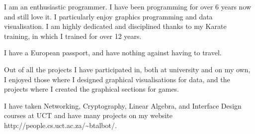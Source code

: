 \documentclass[11pt,a4paper,sans]{moderncv}        %
\begin{document}
I am an enthusiastic programmer. I have been programming for over 6 years now and still love it. I particularly enjoy graphics programming and data visualisation. I am highly dedicated and disciplined thanks to my Karate training, in which I trained for over 12 years.

I have a European passport, and have nothing against having to travel.

Out of all the projects I have participated in, both at university and on my own, I enjoyed those where I designed graphical visualisations for data, and the projects where I created the graphical sections for games. 

I have taken Networking, Cryptography, Linear Algebra, and Interface Design courses at UCT and have many projects on my website http://people.cs.uct.ac.za/\textasciitilde btalbot/.


\makeletterclosing

\clearpage                              %
\end{document}
